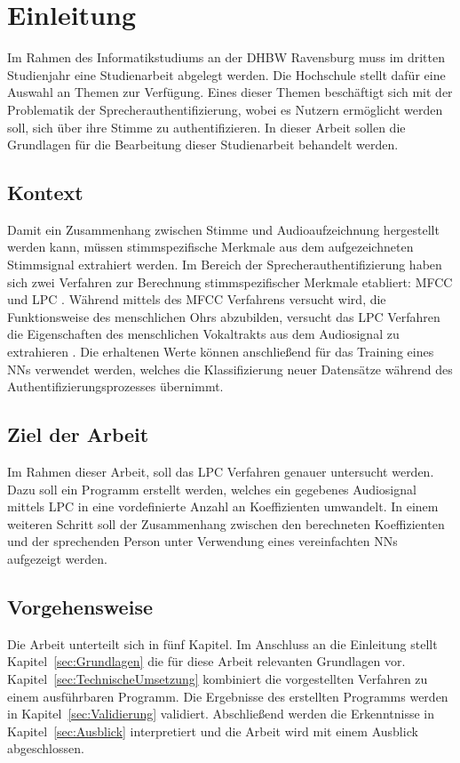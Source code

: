 \section{Einleitung}\label{sec:Einleitung}
Im Rahmen des Informatikstudiums an der \ac{DHBW} Ravensburg muss im dritten Studienjahr eine Studienarbeit abgelegt werden.
Die Hochschule stellt dafür eine Auswahl an Themen zur Verfügung.
Eines dieser Themen beschäftigt sich mit der Problematik der Sprecherauthentifizierung, wobei es Nutzern ermöglicht werden soll, sich über ihre Stimme zu authentifizieren.
In dieser Arbeit sollen die Grundlagen für die Bearbeitung dieser Studienarbeit behandelt werden.

\subsection{Kontext}
Damit ein Zusammenhang zwischen Stimme und Audioaufzeichnung hergestellt werden kann, müssen stimm\-spezifische Merkmale aus dem aufgezeichneten Stimmsignal extrahiert werden.
Im Bereich der Sprecherauthentifizierung haben sich zwei Verfahren zur Berechnung stimm\-spezifischer Merkmale etabliert: \ac{MFCC} und \ac{LPC} \autocite[vgl.][S. 116]{sidorov_text-independent_2010}\autocite[vgl.][S. 726]{chelali_text_2017}.
Während mittels des \ac{MFCC} Verfahrens versucht wird, die Funktionsweise des menschlichen Ohrs abzubilden, versucht das \ac{LPC} Verfahren die Eigenschaften des menschlichen Vokaltrakts aus dem Audiosignal zu extrahieren \autocite[vgl.][S. 117]{sidorov_text-independent_2010}.
Die erhaltenen Werte können anschließend für das Training eines \acp{NN} verwendet werden, welches die Klassifizierung neuer Datensätze während des Authentifizierungsprozesses übernimmt.

\subsection{Ziel der Arbeit}
Im Rahmen dieser Arbeit, soll das \ac{LPC} Verfahren genauer untersucht werden.
Dazu soll ein Programm erstellt werden, welches ein gegebenes Audiosignal mittels \ac{LPC} in eine vordefinierte Anzahl an Koeffizienten umwandelt.
In einem weiteren Schritt soll der Zusammenhang zwischen den berechneten Koeffizienten und der sprechenden Person unter Verwendung eines vereinfachten \acp{NN} aufgezeigt werden.

\subsection{Vorgehensweise}
Die Arbeit unterteilt sich in fünf Kapitel.
Im Anschluss an die Einleitung stellt Kapitel~\ref{sec:Grundlagen} die für diese Arbeit relevanten Grundlagen vor.
Kapitel~\ref{sec:TechnischeUmsetzung} kombiniert die vorgestellten Verfahren zu einem ausführbaren Programm.
Die Ergebnisse des erstellten Programms werden in Kapitel~\ref{sec:Validierung} validiert.
Abschließend werden die Erkenntnisse in Kapitel~\ref{sec:Ausblick} interpretiert und die Arbeit wird mit einem Ausblick abgeschlossen.